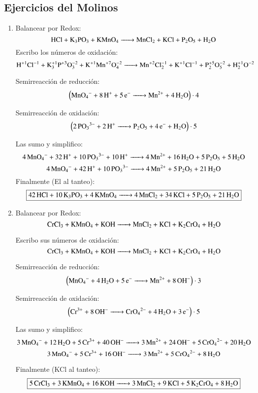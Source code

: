 \subsection{Ejercicios del Molinos}

\begin{enumerate}
\item Balancear por Redox:
$$\ce{
HCl + K3PO3 + KMnO4 ->
MnCl2 + KCl + P2O5 + H2O
}$$
Escribo los números de oxidación:
$$\ce{
H^{+1}Cl^{-1} + K^{+1}3P^{+3}O^{-2}3 + K^{+1}Mn^{+7}O^{-2}4 ->
Mn^{+2}Cl^{-1}2 + K^{+1}Cl^{-1} + P^{+5}2O^{-2}5 + H^{+1}2O^{-2}
}$$


\begin{multicols}{2}
    Semirreacción de reducción:
    $$\left(\ce{
    MnO4^- + 8H^+ + 5e^- ->
    Mn^{2+} + 4H2O
    }\right) \cdot 4$$
    
    Semirreacción de oxidación:
    $$\left(\ce{
    2PO3^{3-} + 2H^+ ->
    P2O5 + 4e^- + H2O
    }\right) \cdot 5$$
\end{multicols}

Las sumo y simplifico:
$$\ce{
4MnO4^- + 32H^+ + 10 PO3^{3-} + 10H^+ ->
4Mn^{2+} + 16H2O + 5P2O5 + 5H2O
}$$
$$\ce{
4MnO4^- + 42H^+ + 10 PO3^{3-} ->
4Mn^{2+} + 5P2O5 + 21H2O
}$$
Finalmente (El  al tanteo):
$$\fbox{\ce{
42HCl + 10K3PO3 + 4KMnO4 ->
4MnCl2 + 34KCl + 5P2O5 + 21H2O
}}$$


\item Balancear por Redox:
$$\ce{
CrCl3 + KMnO4 + KOH ->
MnCl2 + KCl + K2CrO4 + H2O
}$$

Escribo sus números de oxidación:
$$\ce{
CrCl3 + KMnO4 + KOH ->
MnCl2 + KCl + K2CrO4 + H2O
}$$


\begin{multicols}{2}
Semirreacción de reducción:
$$\left(\ce{
MnO4^- + 4H2O + 5e^- ->
Mn^{2+} + 8 OH^{-}
}\right) \cdot 3$$

Semirreacción de oxidación:
$$\left(\ce{
Cr^{3+} + 8OH^- ->
CrO4^{2-} + 4H2O + 3e^-
}\right) \cdot 5$$
\end{multicols}

Las sumo y simplifico:
$$\ce{
3MnO4^- + 12H2O + 5Cr^{3+} + 40OH^- ->
3Mn^{2+} + 24 OH^{-} + 5CrO4^{2-} + 20H2O
}$$
$$\ce{
3MnO4^- + 5Cr^{3+} + 16OH^- ->
3Mn^{2+} + 5CrO4^{2-} + 8H2O
}$$

Finalmente (KCl al tanteo):
$$\fbox{\ce{
5CrCl3 + 3KMnO4 + 16KOH ->
3MnCl2 + 9KCl + 5K2CrO4 + 8H2O
}}$$



\end{enumerate}

